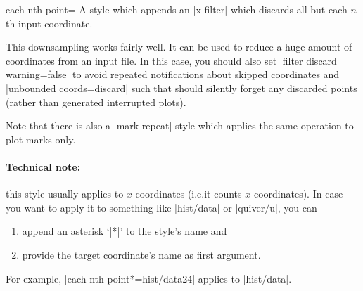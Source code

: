 \begin{pgfplotskey}{each nth point=}
    A style which appends an |x filter| which discards all but each $n$th input
    coordinate.

    This downsampling works fairly well. It can be used to reduce a huge amount
    of coordinates from an input file. In this case, you should also set
    |filter discard warning=false| to avoid repeated notifications about
    skipped coordinates and |unbounded coords=discard| such that \PGFPlots{}
    should silently forget any discarded points (rather than generated
    interrupted plots).

    Note that there is also a |mark repeat| style which applies the same
    operation to plot marks only.


    \paragraph{Technical note:}

    this style usually applies to $x$-coordinates (i.e.\@ it counts $x$
    coordinates). In case you want to apply it to something like |hist/data| or
    |quiver/u|, you can
    \begin{enumerate}
        \item append an asterisk `|*|' to the style's name and
        \item provide the target coordinate's name as first argument.
    \end{enumerate}
    For example, |each nth point*={hist/data}{2}{4}| applies to |hist/data|.
\end{pgfplotskey}

